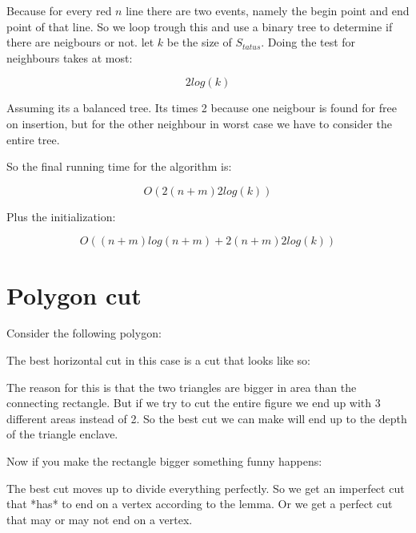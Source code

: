 \documentclass{article}
\begin{document}
Because for every red $n$ line there are two events, namely the begin point and
end point of that line.
So we loop trough this and use a binary tree to determine if there are neigbours
or not.
let $k$ be the size of $S_{tatus}$.
Doing the test for neighbours takes at most:

\[2 log(k)\]

Assuming its a balanced tree. Its times 2 because one neigbour is found for
free on insertion, but for the other neighbour in worst case we have to
consider the entire tree.

So the final running time for the algorithm is:

\[O(2(n+m) 2log(k))\]

Plus the initialization:

\[O((n+m)log(n+m)+2(n+m) 2log(k))\]

\section{Polygon cut}
Consider the following polygon:


The best horizontal cut in this case is a cut that looks like so:


The reason for this is that the two triangles are bigger in area than
the connecting rectangle. But if we try to cut the entire figure we
end up with 3 different areas instead of 2. So the best cut we can
make will end up to  the depth of the triangle enclave.

Now if you make the rectangle bigger something funny happens:


The best cut moves up to divide everything perfectly.
So we get an imperfect cut that *has* to end on a vertex according to
the lemma. Or we get a perfect cut that may or may not end on a vertex.
\end{document}
